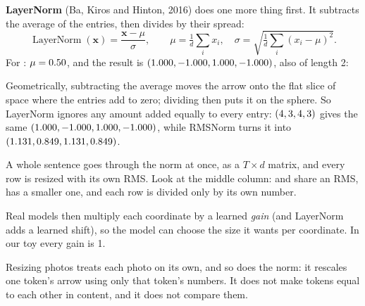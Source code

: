 \textbf{LayerNorm} (Ba, Kiros and Hinton, 2016) does one more thing first. It subtracts the average of the
entries, then divides by their spread:
\[
\operatorname{LayerNorm}(\bm{x}) = \frac{\bm{x}-\mu}{\sigma}, \qquad \mu=\tfrac1d\textstyle\sum_i x_i,\quad
\sigma=\sqrt{\tfrac1d\textstyle\sum_i (x_i-\mu)^2}.
\]
For : $\mu=0.50$, and the result is $(1.000, -1.000, 1.000, -1.000)$, also of length 2:

\par\medskip\noindent\begin{minipage}{\linewidth}\centering

\end{minipage}\par\medskip

\noindent Geometrically,
subtracting the average moves the arrow onto the flat slice of space where the entries add to zero; dividing then
puts it on the sphere. So LayerNorm ignores any amount added equally to every entry: $(4, 3, 4, 3)$ gives the same
$(1.000, -1.000, 1.000, -1.000)$, while RMSNorm turns it into $(1.131, 0.849, 1.131, 0.849)$.

A whole sentence goes through the norm at once, as a $T\times d$ matrix, and every row is resized with its own
RMS. Look at the middle column:  and  share an RMS,  has a smaller one, and each row
is divided only by its own number.

\par\medskip\noindent\begin{minipage}{\linewidth}\centering

\end{minipage}\par\medskip

Real models then multiply each coordinate by a learned \emph{gain} (and LayerNorm adds a learned shift), so the
model can choose the size it wants per coordinate. In our toy every gain is 1.

\begin{breaks}
Resizing photos treats each photo on its own, and so does the norm: it rescales one token's arrow using only that
token's numbers. It does not make tokens equal to each other in content, and it does not compare them.
\end{breaks}

